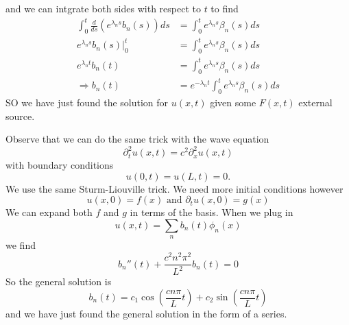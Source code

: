 \begin{ex}
and we can intgrate both sides with respect to $t$ to find
\begin{subequations}
\begin{align}
\int^{t}_{0}\frac{d}{ds}(e^{\lambda_ns}b_{n}(s))ds &= \int^{t}_{0}e^{\lambda_ns}\beta_{n}(s)ds\\
e^{\lambda_ns}b_{n}(s)|^{t}_{0}&=\int^{t}_{0}e^{\lambda_ns}\beta_{n}(s)ds\\
e^{\lambda_nt}b_{n}(t)&=\int^{t}_{0}e^{\lambda_ns}\beta_{n}(s)ds\\
\Rightarrow b_{n}(t)&=e^{-\lambda_nt}\int^{t}_{0}e^{\lambda_ns}\beta_{n}(s)ds
\end{align}
\end{subequations}
SO we have just found the solution for $u(x,t)$ given some
$F(x,t)$ external source.
\end{ex}

Observe that we can do the same trick with the wave equation
\begin{equation}
\partial_{t}^{2}u(x,t) = c^{2}\partial_{x}^{2}u(x,t)
\end{equation}
with boundary conditions
\begin{equation}
u(0,t)=u(L,t)=0.
\end{equation}
We use the same Sturm-Liouville trick. We need more initial
conditions however
\begin{equation}
u(x,0)=f(x)\text{ and }\partial_{t}u(x,0)=g(x)
\end{equation}
We can expand both $f$ and $g$ in terms of the basis. When
we plug in
\begin{equation}
u(x,t) = \sum_{n}b_{n}(t)\phi_{n}(x)
\end{equation}
we find
\begin{equation}
b_{n}''(t) + \frac{c^2n^2\pi^2}{L^2}b_{n}(t) = 0
\end{equation}
So the general solution is
\begin{equation}
b_{n}(t) = c_{1}\cos\left(\frac{cn\pi}{L}t\right)+c_{2}\sin\left(\frac{cn\pi}{L}t\right)
\end{equation}
and we have just found the general solution in the form of a
series. 
